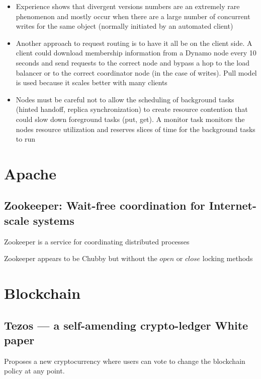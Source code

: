 \documentclass[a4paper]{article}
\begin{document}
\begin{itemize}
\begin{itemize}
\begin{itemize}
\item Experience shows that divergent versions numbers are an extremely rare phenomenon and mostly occur when there are a large number of concurrent writes for the same object (normally initiated by an automated client)

\item Another approach to request routing is to have it all be on the client side. A client could download membership information from a Dynamo node every 10 seconds and send requests to the correct node and bypass a hop to the load balancer or to the correct coordinator node (in the case of writes). Pull model is used because it scales better with many clients

\item Nodes must be careful not to allow the scheduling of background tasks (hinted handoff, replica synchronization) to create resource contention that could slow down foreground tasks (put, get). A monitor task monitors the nodes resource utilization and reserves slices of time for the background tasks to run
\end{itemize}

\end{itemize}
\end{itemize}

\section{Apache}

\subsection{Zookeeper: Wait-free coordination for Internet-scale systems}

Zookeeper is a service for coordinating distributed processes

Zookeeper appears to be Chubby but without the $open$ or $close$ locking methods

\section{Blockchain}

\subsection{Tezos — a self-amending crypto-ledger White paper}

Proposes a new cryptocurrency where users can vote to change the blockchain policy at any point.
\end{document}
